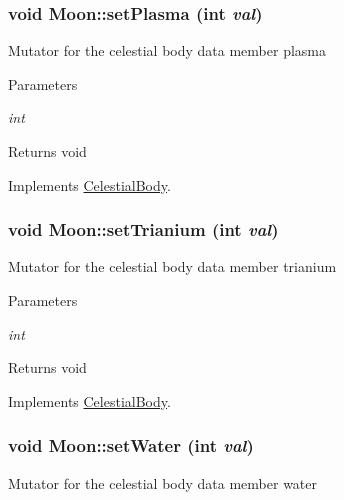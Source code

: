 \hypertarget{classMoon_a3bff2a5c897c5c66b6e16b16077ba1cc}{
\subsubsection[{setPlasma}]{\setlength{\rightskip}{0pt plus 5cm}void Moon::setPlasma (int {\em val})}}
\label{d8/d6f/classMoon_a3bff2a5c897c5c66b6e16b16077ba1cc}
Mutator for the celestial body data member plasma


\begin{DoxyParams}{Parameters}
\item[{\em int}]\end{DoxyParams}
\begin{DoxyReturn}{Returns}
void 
\end{DoxyReturn}


Implements \hyperlink{classCelestialBody}{CelestialBody}.

\hypertarget{classMoon_a76c433c77c0efca8fd093630b1767f13}{
\subsubsection[{setTrianium}]{\setlength{\rightskip}{0pt plus 5cm}void Moon::setTrianium (int {\em val})}}
\label{d8/d6f/classMoon_a76c433c77c0efca8fd093630b1767f13}
Mutator for the celestial body data member trianium


\begin{DoxyParams}{Parameters}
\item[{\em int}]\end{DoxyParams}
\begin{DoxyReturn}{Returns}
void 
\end{DoxyReturn}


Implements \hyperlink{classCelestialBody}{CelestialBody}.

\hypertarget{classMoon_a489d140b5ff38114cd0f5f15512a99d4}{
\subsubsection[{setWater}]{\setlength{\rightskip}{0pt plus 5cm}void Moon::setWater (int {\em val})}}
\label{d8/d6f/classMoon_a489d140b5ff38114cd0f5f15512a99d4}
Mutator for the celestial body data member water


